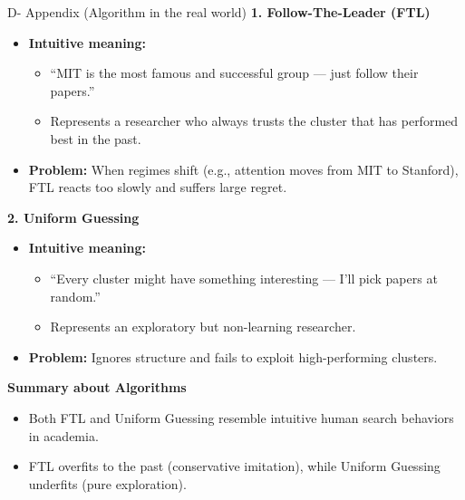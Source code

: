 \documentclass{beamer}
\begin{document}
\begin{frame}{D- Appendix (Algorithm in the real world)}
\scriptsize
\textbf{1. Follow-The-Leader (FTL)}
    \begin{itemize}
        \item \textbf{Intuitive meaning:}
              \begin{itemize}
                  \item “MIT is the most famous and successful group — 
                        just follow their papers.”
                  \item Represents a researcher who always trusts 
                        the cluster that has performed best in the past.
              \end{itemize}
        \item \textbf{Problem:} 
              When regimes shift (e.g., attention moves from MIT to Stanford),
              FTL reacts too slowly and suffers large regret.
    \end{itemize}
\textbf{2. Uniform Guessing}
    \begin{itemize}
        \item \textbf{Intuitive meaning:}
              \begin{itemize}
                  \item “Every cluster might have something interesting —
                        I’ll pick papers at random.”
                  \item Represents an exploratory but non-learning researcher.
              \end{itemize}
        \item \textbf{Problem:} 
              Ignores structure and fails to exploit high-performing clusters.
    \end{itemize}
\textbf{Summary about Algorithms}
    \begin{itemize}
        \item Both FTL and Uniform Guessing resemble 
              intuitive human search behaviors in academia.
        \item FTL overfits to the past (conservative imitation),
              while Uniform Guessing underfits (pure exploration).
    \end{itemize}
\end{frame}
\end{document}
